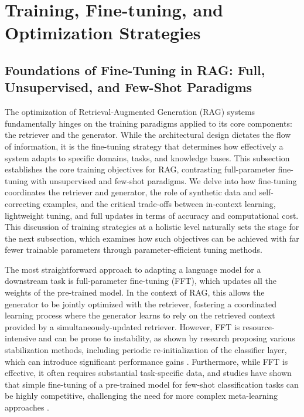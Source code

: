 \documentclass[11pt]{article}
\begin{document}
\section{Training, Fine-tuning, and Optimization Strategies}

\subsection{Foundations of Fine-Tuning in RAG: Full, Unsupervised, and Few-Shot Paradigms}

The optimization of Retrieval-Augmented Generation (RAG) systems fundamentally hinges on the training paradigms applied to its core components: the retriever and the generator. While the architectural design dictates the flow of information, it is the fine-tuning strategy that determines how effectively a system adapts to specific domains, tasks, and knowledge bases. This subsection establishes the core training objectives for RAG, contrasting full-parameter fine-tuning with unsupervised and few-shot paradigms. We delve into how fine-tuning coordinates the retriever and generator, the role of synthetic data and self-correcting examples, and the critical trade-offs between in-context learning, lightweight tuning, and full updates in terms of accuracy and computational cost. This discussion of training strategies at a holistic level naturally sets the stage for the next subsection, which examines how such objectives can be achieved with far fewer trainable parameters through parameter-efficient tuning methods.

The most straightforward approach to adapting a language model for a downstream task is full-parameter fine-tuning (FFT), which updates all the weights of the pre-trained model. In the context of RAG, this allows the generator to be jointly optimized with the retriever, fostering a coordinated learning process where the generator learns to rely on the retrieved context provided by a simultaneously-updated retriever. However, FFT is resource-intensive and can be prone to instability, as shown by research proposing various stabilization methods, including periodic re-initialization of the classifier layer, which can introduce significant performance gains \cite{ref197}. Furthermore, while FFT is effective, it often requires substantial task-specific data, and studies have shown that simple fine-tuning of a pre-trained model for few-shot classification tasks can be highly competitive, challenging the need for more complex meta-learning approaches \cite{ref198,ref199}.
\end{document}
